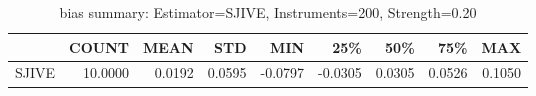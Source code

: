 \begin{table}[ht]
\centering
\caption{bias summary: Estimator=SJIVE, Instruments=200, Strength=0.20}
\begin{tabular}{lrrrrrrrr}
\toprule
 & COUNT & MEAN & STD & MIN & 25\% & 50\% & 75\% & MAX \\
\midrule
SJIVE & 10.0000 & 0.0192 & 0.0595 & -0.0797 & -0.0305 & 0.0305 & 0.0526 & 0.1050 \\
\bottomrule
\end{tabular}
\end{table}
